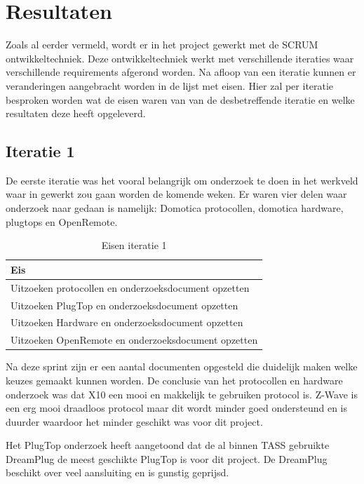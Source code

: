 \documentclass[]{article}
\begin{document}
\newpage
\section{Resultaten}

Zoals al eerder vermeld, wordt er in het project gewerkt met de SCRUM
ontwikkeltechniek. Deze ontwikkeltechniek werkt met verschillende iteraties
waar verschillende requirements afgerond worden. Na afloop van een iteratie
kunnen er veranderingen aangebracht worden in de lijst met eisen. Hier zal
per iteratie besproken worden wat de eisen waren van van de desbetreffende
iteratie en welke resultaten deze heeft opgeleverd.

\subsection{Iteratie 1}
De eerste iteratie was het vooral belangrijk om onderzoek te doen in het
werkveld waar in gewerkt zou gaan worden de komende weken. Er waren vier
delen waar onderzoek naar gedaan is namelijk: Domotica protocollen,
domotica hardware, plugtops en OpenRemote.

\begin{table}[htpb]
  \caption{Eisen iteratie 1}
  \begin{center}
    \begin{tabular}{|| l ||}\hline
        Eis                                                  \\\hline\hline
        Uitzoeken protocollen en onderzoeksdocument opzetten \\\hline
        Uitzoeken PlugTop en onderzoeksdocument opzetten     \\\hline
        Uitzoeken Hardware en onderzoeksdocument opzetten    \\\hline
        Uitzoeken OpenRemote en onderzoeksdocument opzetten  \\\hline
    \end{tabular}
  \end{center}
\end{table}

Na deze sprint zijn er een aantal documenten opgesteld die duidelijk maken
welke keuzes gemaakt kunnen worden. De conclusie van het protocollen en
hardware onderzoek was dat X10 een mooi en makkelijk te gebruiken protocol
is. Z-Wave is een erg mooi draadloos protocol maar dit wordt minder goed
ondersteund en is duurder waardoor het minder geschikt was voor dit
project.

Het PlugTop onderzoek heeft aangetoond dat de al binnen TASS gebruikte
DreamPlug de meest geschikte PlugTop is voor dit project. De DreamPlug
beschikt over veel aansluiting en is gunstig geprijsd.
\end{document}
